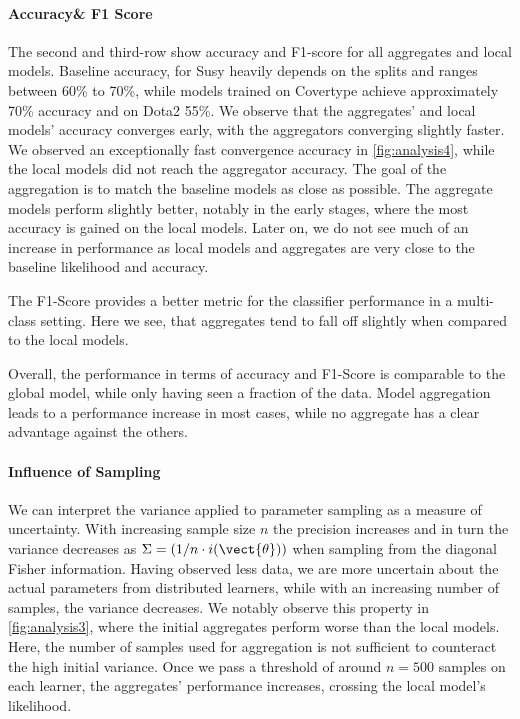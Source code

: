 \paragraph*{Accuracy\& F1 Score}
The second and third-row show accuracy and F1-score for all aggregates and local models.
Baseline accuracy, for Susy heavily depends on the splits and ranges between 60\% to 70\%, while models trained on Covertype achieve approximately 70\% accuracy and on Dota2 55\%.
We observe that the aggregates' and local models' accuracy converges early, with the aggregators converging slightly faster.
We observed an exceptionally fast convergence \wrt accuracy in \autoref{fig:analysis4}, while the local models did not reach the aggregator accuracy.
The goal of the aggregation is to match the baseline models as close as possible.
The aggregate models perform slightly better, notably in the early stages, where the most accuracy is gained on the local models. 
Later on, we do not see much of an increase in performance as local models and aggregates are very close to the baseline likelihood and accuracy.

The F1-Score provides a better metric for the classifier performance in a multi-class setting. 
Here we see, that aggregates tend to fall off slightly when compared to the local models.

Overall, the performance in terms of accuracy and F1-Score is comparable to the global model, while only having seen a fraction of the data.
Model aggregation leads to a performance increase in most cases, while no aggregate has a clear advantage against the others.

\paragraph*{Influence of Sampling}
We can interpret the variance applied to parameter sampling as a measure of uncertainty. 
With increasing sample size $n$ the precision increases and in turn the variance decreases as $\Sigma = (1/n\cdot i(\vect{\theta}))$ when sampling from the diagonal Fisher information.
Having observed less data, we are more uncertain about the actual parameters from distributed learners, while with an increasing number of samples, the variance decreases.
We notably observe this property in \autoref{fig:analysis3}, where the initial aggregates perform worse than the local models.
Here, the number of samples used for aggregation is not sufficient to counteract the high initial variance.
Once we pass a threshold of around $n=500$  samples on each learner, the aggregates' performance increases, crossing the local model's likelihood.

